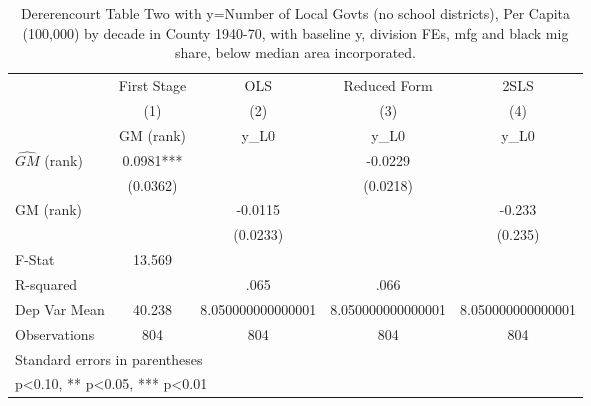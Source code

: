 \begin{table}[htbp]\centering
\def\sym#1{\ifmmode^{#1}\else\(^{#1}\)\fi}
\caption{Dererencourt Table Two with y=Number of Local Govts (no school districts), Per Capita (100,000) by decade in County 1940-70, with baseline y, division FEs, mfg and black mig share, below median area incorporated.}
\begin{tabular}{l*{4}{c}}
\toprule
                    & First Stage   &         OLS   &Reduced Form   &        2SLS   \\
                    &\multicolumn{1}{c}{(1)}&\multicolumn{1}{c}{(2)}&\multicolumn{1}{c}{(3)}&\multicolumn{1}{c}{(4)}\\
                    &\multicolumn{1}{c}{GM  (rank)}&\multicolumn{1}{c}{y\_L0}&\multicolumn{1}{c}{y\_L0}&\multicolumn{1}{c}{y\_L0}\\
\midrule
$\hat{GM}$ (rank)   &      0.0981***&               &     -0.0229   &               \\
                    &    (0.0362)   &               &    (0.0218)   &               \\
\addlinespace
GM  (rank)          &               &     -0.0115   &               &      -0.233   \\
                    &               &    (0.0233)   &               &     (0.235)   \\
\midrule
F-Stat              &      13.569   &               &               &               \\
R-squared           &               &        .065   &        .066   &               \\
Dep Var Mean        &      40.238   &8.050000000000001   &8.050000000000001   &8.050000000000001   \\
Observations        &         804   &         804   &         804   &         804   \\
\bottomrule
\multicolumn{5}{l}{\footnotesize Standard errors in parentheses}\\
\multicolumn{5}{l}{\footnotesize * p<0.10, ** p<0.05, *** p<0.01}\\
\end{tabular}
\end{table}
